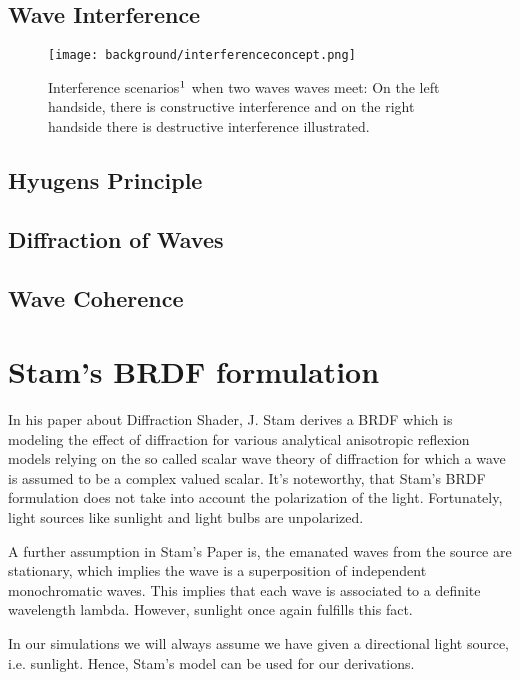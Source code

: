 \subsection{Wave Interference}

\begin{figure}[H]
  \centering
  \texttt{[image: background/interferenceconcept.png]}
  \caption[interference]{Interference scenarios$\footnotemark$ when two waves waves meet: On the left handside, there is constructive interference and on the right handside there is destructive interference illustrated.}
  \label{fig:interferenceconcept}
\end{figure}


\subsection{Hyugens Principle}
\subsection{Diffraction of Waves}
\subsection{Wave Coherence}

\section{Stam's BRDF formulation}
\label{sec:sumstam}
In his paper about Diffraction Shader, J. Stam derives a BRDF which is modeling the effect of diffraction for various analytical anisotropic reflexion models relying on the so called scalar wave theory of diffraction for which a wave is assumed to be a complex valued scalar. 
It's noteworthy, that Stam's BRDF formulation does not take into account the polarization of the light. Fortunately, light sources like sunlight and light bulbs are unpolarized. 

A further assumption in Stam's Paper is, the emanated waves from the source are stationary, which implies the wave is a superposition of independent monochromatic waves. This implies that each wave is associated to a definite wavelength lambda. However, sunlight once again fulfills this fact.

In our simulations we will always assume we have given a directional light source, i.e. sunlight. Hence, Stam's model can be used for our derivations.

